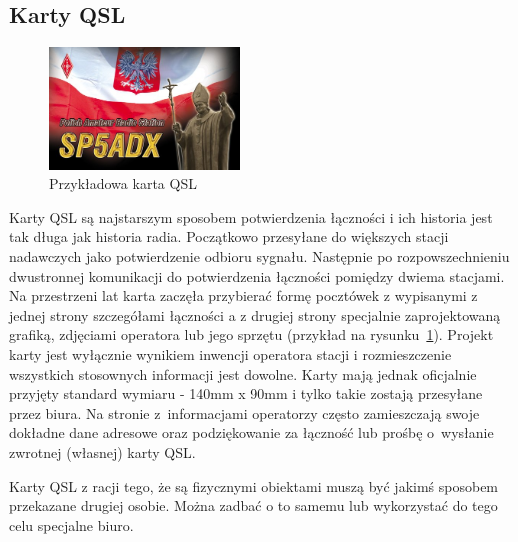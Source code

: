 \documentclass[]{mgr}
\begin{document}
            \subsection{Karty QSL}
            \begin{figure}
                \vspace{-25pt}
                \begin{center}
                    \includegraphics[width=0.45\textwidth]{qsl_card}
                \end{center}
                \vspace{-20pt}
                \caption{Przykładowa karta QSL}
                \vspace{-10pt}
                \label{fig:qsl_card}
            \end{figure}

            Karty QSL są najstarszym sposobem potwierdzenia łączności i ich historia jest tak długa jak historia radia. Początkowo przesyłane do większych stacji nadawczych jako potwierdzenie odbioru sygnału. Następnie po rozpowszechnieniu dwustronnej komunikacji do potwierdzenia łączności pomiędzy dwiema stacjami. Na przestrzeni lat karta zaczęła przybierać formę pocztówek z wypisanymi z jednej strony szczegółami łączności a z drugiej strony specjalnie zaprojektowaną grafiką, zdjęciami operatora lub jego sprzętu (przykład na rysunku~\ref{fig:qsl_card}). Projekt karty jest wyłącznie wynikiem inwencji operatora stacji i rozmieszczenie wszystkich stosownych informacji jest dowolne. Karty mają jednak oficjalnie przyjęty standard wymiaru - 140mm x 90mm i tylko takie zostają przesyłane przez biura. Na stronie z~informacjami operatorzy często zamieszczają swoje dokładne dane adresowe oraz podziękowanie za łączność lub prośbę o~wysłanie zwrotnej (własnej) karty QSL.

            Karty QSL z racji tego, że są fizycznymi obiektami muszą być jakimś sposobem przekazane drugiej osobie. Można zadbać o to samemu lub wykorzystać do tego celu specjalne biuro.
\end{document}
